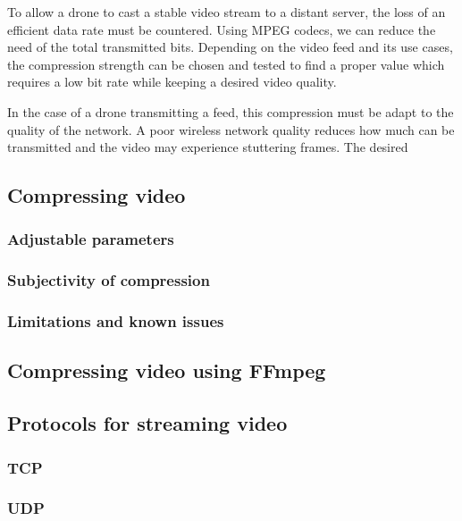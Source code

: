 To allow a drone to cast a stable video stream to a distant server, the loss of an efficient data rate must be countered. Using MPEG codecs, we can reduce the need of the total transmitted bits. Depending on the video feed and its use cases, the compression strength can be chosen and tested to find a proper value which requires a low bit rate while keeping a desired video quality.

In the case of a drone transmitting a feed, this compression must be adapt to the quality of the network. A poor wireless network quality reduces how much can be transmitted and the video may experience stuttering frames. The desired 

\subsection{Compressing video}

\subsubsection{Adjustable parameters}

\subsubsection{Subjectivity of compression}

\subsubsection{Limitations and known issues}

\subsection{Compressing video using FFmpeg}

\subsection{Protocols for streaming video}

\subsubsection{TCP}

\subsubsection{UDP}




